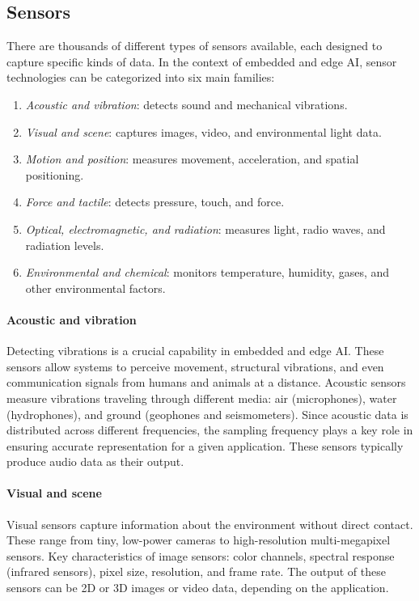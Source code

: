 \subsection{Sensors}
There are thousands of different types of sensors available, each designed to capture specific kinds of data. 
In the context of embedded and edge AI, sensor technologies can be categorized into six main families:
\begin{enumerate}
    \item \textit{Acoustic and vibration}: detects sound and mechanical vibrations.
    \item \textit{Visual and scene}: captures images, video, and environmental light data.
    \item \textit{Motion and position}: measures movement, acceleration, and spatial positioning.
    \item \textit{Force and tactile}: detects pressure, touch, and force.
    \item \textit{Optical, electromagnetic, and radiation}: measures light, radio waves, and radiation levels.
    \item \textit{Environmental and chemical}: monitors temperature, humidity, gases, and other environmental factors.
\end{enumerate}

\paragraph*{Acoustic and vibration}
Detecting vibrations is a crucial capability in embedded and edge AI. 
These sensors allow systems to perceive movement, structural vibrations, and even communication signals from humans and animals at a distance.
Acoustic sensors measure vibrations traveling through different media: air (microphones), water (hydrophones), and ground (geophones and seismometers).
Since acoustic data is distributed across different frequencies, the sampling frequency plays a key role in ensuring accurate representation for a given application. 
These sensors typically produce audio data as their output.

\paragraph*{Visual and scene}
Visual sensors capture information about the environment without direct contact. 
These range from tiny, low-power cameras to high-resolution multi-megapixel sensors.
Key characteristics of image sensors: color channels, spectral response (infrared sensors), pixel size, resolution, and frame rate.
The output of these sensors can be 2D or 3D images or video data, depending on the application.

